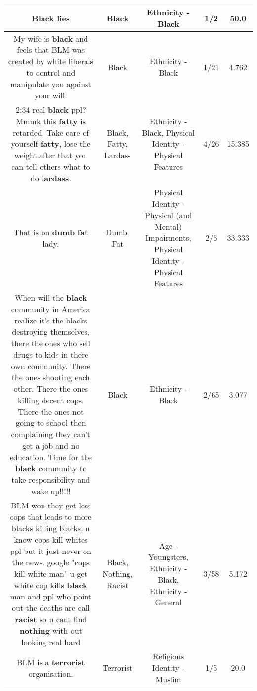 \documentclass[11pt]{article}
\newlength\mylength
\begin{document}
\begin{center}
\begin{longtable}{|C{.65\mylength}|C{.30\mylength}|C{.12\mylength}|C{.12\mylength}|C{.12\mylength}|}
  \small Black lies\normalsize   & Black & Ethnicity - Black & 1/2 & 50.0 \\  \hline
  \small My wife is \textbf{black} and feels that BLM was created by white liberals to control and manipulate you against your will.\normalsize   & Black & Ethnicity - Black & 1/21 & 4.762 \\  \hline
  \small 2:34 real \textbf{black} ppl? Mmmk this \textbf{fatty} is retarded. Take care of yourself \textbf{fatty}, lose the weight.after that you can tell others what to do \textbf{lardass}.\normalsize   & Black, Fatty, Lardass & Ethnicity - Black, Physical Identity - Physical Features & 4/26 & 15.385 \\  \hline
  \small That is on \textbf{dumb} \textbf{fat} lady.\normalsize   & Dumb, Fat & Physical Identity - Physical (and Mental) Impairments, Physical Identity - Physical Features & 2/6 & 33.333 \\  \hline
  \small When will the \textbf{black} community in America realize it's the blacks destroying themselves, there the ones who sell drugs to kids in there own community. There the ones shooting each other. There the ones killing decent cops. There the ones not going to school then complaining they can't get a job and no education. Time for the \textbf{black} community to take responsibility and wake up!!!!!\normalsize   & Black & Ethnicity - Black & 2/65 & 3.077 \\  \hline
  \small BLM won they get less cops that leads to more blacks killing blacks. u know cops kill whites ppl but it just never on the news. google "cops kill white man" u get white cop kills \textbf{black} man and ppl who point out the deaths are call \textbf{racist} so u cant find \textbf{nothing} with out looking real hard\normalsize   & Black, Nothing, Racist & Age - Youngsters, Ethnicity - Black, Ethnicity - General & 3/58 & 5.172 \\  \hline
  \small BLM is a \textbf{terrorist} organisation.\normalsize   & Terrorist & Religious Identity - Muslim & 1/5 & 20.0 \\  \hline

\end{longtable}
\end{center}
\end{document}
